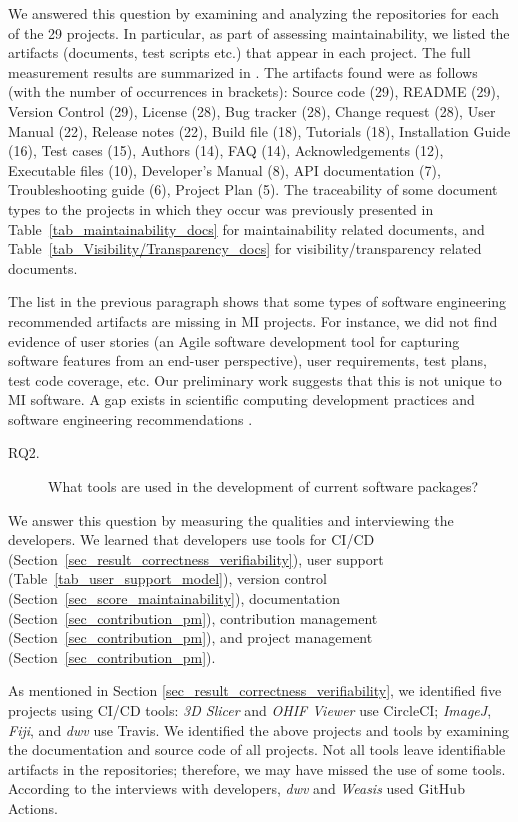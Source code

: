 \documentclass[final, 3p, times, authoryear]{elsarticle}
\begin{document}
We answered this question by examining and analyzing the repositories for each
of the 29 projects.  In particular, as part of assessing maintainability, we
listed the artifacts (documents, test scripts etc.) that appear in each project.
The full measurement results are summarized in \citet{Dong2021-Data}.  The
artifacts found were as follows (with the number of occurrences in brackets):
Source code (29), README (29), Version Control (29), License (28), Bug tracker
(28), Change request (28), User Manual (22), Release notes (22), Build file
(18), Tutorials (18), Installation Guide (16), Test cases (15), Authors (14),
FAQ (14), Acknowledgements (12), Executable files (10), Developer's Manual (8),
API documentation (7), Troubleshooting guide (6), Project Plan (5).  The
traceability of some document types to the projects in which they occur was
previously presented in Table~\ref{tab_maintainability_docs} for maintainability
related documents, and Table~\ref{tab_Visibility/Transparency_docs} for
visibility/transparency related documents.

The list in the previous paragraph shows that some types of software engineering
recommended artifacts are missing in MI projects.  For instance, we did not find
evidence of user stories (an Agile software development tool for capturing
software features from an end-user perspective), user requirements, test plans,
test code coverage, etc.  Our preliminary work suggests that this is not unique
to MI software.  A gap exists in scientific computing development practices and
software engineering recommendations \citep{OwojaiyeEtAl2021_CSE}.

\begin{description}
\item[RQ2.] What tools are used in the development of current software packages?
\end{description}

We answer this question by measuring the qualities and interviewing the
developers. We learned that developers use tools for CI/CD
(Section~\ref{sec_result_correctness_verifiability}), user support
(Table~\ref{tab_user_support_model}), version control
(Section~\ref{sec_score_maintainability}), documentation
(Section~\ref{sec_contribution_pm}), contribution management
(Section~\ref{sec_contribution_pm}), and project management
(Section~\ref{sec_contribution_pm}).

As mentioned in Section \ref{sec_result_correctness_verifiability}, we
identified five projects using CI/CD tools: \textit{3D Slicer} and \textit{OHIF
Viewer} use CircleCI; \textit{ImageJ}, \textit{Fiji}, and \textit{dwv} use
Travis. We identified the above projects and tools by examining the
documentation and source code of all projects. Not all tools leave identifiable
artifacts in the repositories; therefore, we may have missed the use of some
tools. According to the interviews with developers, \textit{dwv} and
\textit{Weasis} used GitHub Actions.
\end{document}
